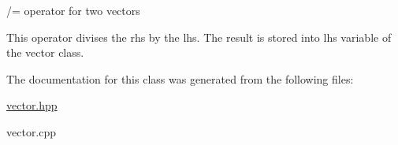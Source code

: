 /= operator for two vectors 

This operator divises the rhs by the lhs. The result is stored into lhs variable of the vector class. 

The documentation for this class was generated from the following files\+:\begin{DoxyCompactItemize}
\item 
\hyperlink{vector_8hpp}{vector.\+hpp}\item 
vector.\+cpp\end{DoxyCompactItemize}
